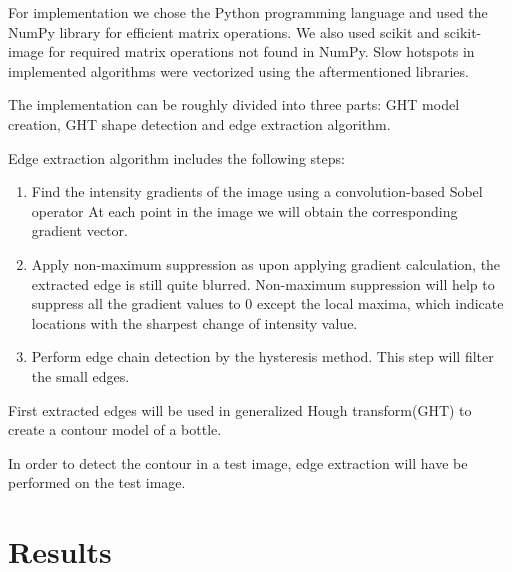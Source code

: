 \documentclass[letterpaper,12pt]{article}
\begin{document}
For implementation we chose the Python programming language and used the NumPy library
for efficient matrix operations.  We also used scikit and scikit-image for required
matrix operations not found in NumPy.  Slow hotspots in implemented algorithms
were vectorized using the aftermentioned libraries.

The implementation can be roughly divided into three parts: GHT model creation, GHT shape detection and edge extraction algorithm.

Edge extraction algorithm includes the following steps:

\begin{enumerate}
    \item Find the intensity gradients of the image using a convolution-based Sobel operator At each point in the image we will obtain the corresponding gradient vector.
   \item Apply non-maximum suppression as upon applying gradient calculation, the extracted edge is still quite blurred. Non-maximum suppression will help to suppress all the gradient values to 0 except the local maxima, which indicate locations with the sharpest change of intensity value.
	\item Perform edge chain detection by the hysteresis method. This step will filter the small edges.

\end{enumerate}

First extracted edges will be used in generalized Hough transform(GHT) to create a contour model of a bottle.


In order to detect the contour in a test image, edge extraction will have be performed on the test image. 


\section{Results}
\end{document}
